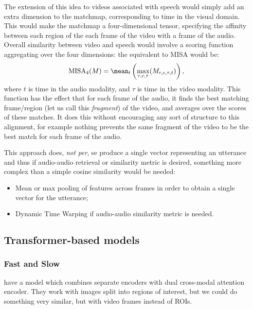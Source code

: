 The extension of this idea to videos associated with speech would
simply add an extra dimension to the matchmap, corresponding to time
in the visual domain. This would make the matchmap a four-dimensional
tensor, specifying the affinity between each region of the each frame
of the video with a frame of the audio. Overall similarity between
video and speech would involve a scoring function aggregating over
the four dimensions: the equivalent to MISA would be:
\begin{equation}
  \label{eq:misa4}
  \mathrm{MISA}_4(M) = \mean_t \left(\max_{r,c,\tau}(M_{r,c,\tau,t})\right),
\end{equation}
where $t$ is time in the audio modality, and $\tau$ is time in the
video modality. This function has the effect that for each frame of
the audio, it finds the best matching frame/region (let us call this
{\it fragment}) of the video, and averages over the scores of these
matches. It does this without encouraging any sort of structure to
this alignment, for example nothing prevents the same fragment of the
video to be the best match for each frame of the audio.

This approach does, \textit{not per}, se produce a single vector
representing an utterance and thus if audio-audio retrieval or
similarity metric is desired, something more complex than a simple
cosine similarity would be needed:

\begin{itemize}
  \label{itemize:pool}
\item Mean or max pooling of features across frames in order to obtain
  a single vector for the utterance;
\item Dynamic Time Warping if audio-audio similarity metric is needed.
\end{itemize}



\subsection{Transformer-based models}
\subsubsection{Fast and Slow}
\citet{peng2021fastslow} have a model which combines separate encoders
with dual cross-modal attention encoder. They work with images split
into regions of interest, but we could do something very similar, but
with video frames instead of ROIs.

